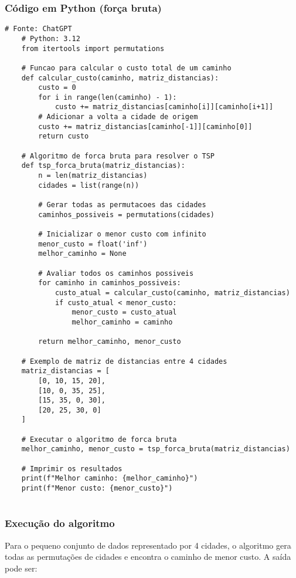 \documentclass{article}
\begin{document}
\subsubsection{Código em Python (força bruta)}
\begin{lstlisting}[style=mypython]
    # Fonte: ChatGPT
    # Python: 3.12
    from itertools import permutations

    # Funcao para calcular o custo total de um caminho
    def calcular_custo(caminho, matriz_distancias):
        custo = 0
        for i in range(len(caminho) - 1):
            custo += matriz_distancias[caminho[i]][caminho[i+1]]
        # Adicionar a volta a cidade de origem
        custo += matriz_distancias[caminho[-1]][caminho[0]]
        return custo
    
    # Algoritmo de forca bruta para resolver o TSP
    def tsp_forca_bruta(matriz_distancias):
        n = len(matriz_distancias)
        cidades = list(range(n))
        
        # Gerar todas as permutacoes das cidades
        caminhos_possiveis = permutations(cidades)
        
        # Inicializar o menor custo com infinito
        menor_custo = float('inf')
        melhor_caminho = None
        
        # Avaliar todos os caminhos possiveis
        for caminho in caminhos_possiveis:
            custo_atual = calcular_custo(caminho, matriz_distancias)
            if custo_atual < menor_custo:
                menor_custo = custo_atual
                melhor_caminho = caminho
        
        return melhor_caminho, menor_custo
    
    # Exemplo de matriz de distancias entre 4 cidades
    matriz_distancias = [
        [0, 10, 15, 20],
        [10, 0, 35, 25],
        [15, 35, 0, 30],
        [20, 25, 30, 0]
    ]
    
    # Executar o algoritmo de forca bruta
    melhor_caminho, menor_custo = tsp_forca_bruta(matriz_distancias)
    
    # Imprimir os resultados
    print(f"Melhor caminho: {melhor_caminho}")
    print(f"Menor custo: {menor_custo}")
    
\end{lstlisting}

\subsubsection{Execução do algoritmo}
Para o pequeno conjunto de dados representado por 4 cidades, o 
algoritmo gera todas as permutações de cidades e encontra o caminho 
de menor custo. A saída pode ser:
\end{document}

